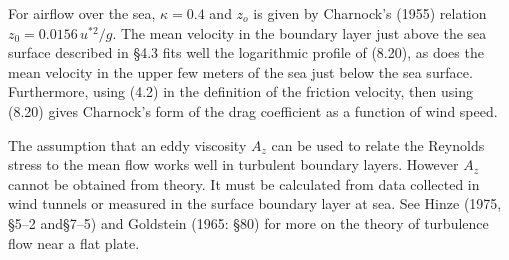 \begin{table}[h!]
{{\begin{minipage}{11.5cm}
\hspace*{1 em}For airflow over the sea, $\kappa = 0.4$ and $z_o$ is given by
Charnock's (1955) relation $z_0 = 0.0156 \, u^{*2}/g$. The mean velocity in the boundary layer just above the sea surface described in \S 4.3 fits well the logarithmic profile of (8.20), as does the mean velocity in the upper few meters of the sea just below the sea surface. Furthermore, using (4.2) in the
definition of the friction velocity, then using (8.20)
gives Charnock's form of the drag coefficient as a function of wind
speed.\rule[-1ex]{0mm}{1ex}
\vspace{0.5ex}
\end{minipage}
}}
\vspace{-3ex}
\end{table}

The assumption that an eddy viscosity $A_z$ can be used to relate the Reynolds stress to the mean flow works well in turbulent boundary layers. However $A_z$ cannot be obtained from theory. It must be calculated from data collected in wind tunnels or measured in the surface boundary layer at sea. See Hinze (1975, \S5--2 and\S7--5) and Goldstein (1965: \S80) for more on the theory of turbulence flow near a flat plate.

